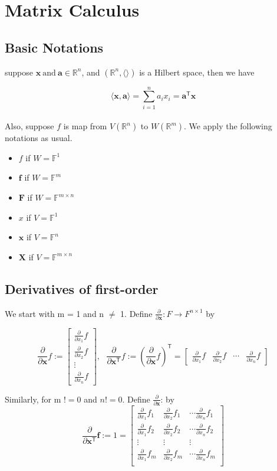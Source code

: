 \documentclass[12pt]{book}
\theoremstyle{definition}
\newcommand{\ra}{\rangle}
\newcommand{\la}{\langle}
\newcommand{\inner}[2]{{\langle #1,#2\rangle}}
\newcommand{\x}{\mathbf{x}}
\newcommand{\xt}{\mathbf{x}^{\mathsf{T}}}
\newcommand{\T}{{\mathsf{T}}}
\newcommand{\abf}{\mathbf{a}}
\newcommand{\abft}{\mathbf{a}^{\mathsf{T}}}
\newcommand{\R}{\mathbb{R}}
\newcommand{\F}{\mathbb{F}}
\newcommand{\X}{\mathbf{X}}
\newcommand{\f}{\mathbf{f}}
\newcommand{\pd}[1]{\frac{\partial}{\partial #1}}
\begin{document}
\chapter{Matrix Calculus}
\section{Basic Notations}
suppose $\x \ \text{and}\ \abf \in \mathbb{R}^n$, and $(\mathbb{R}^n,\la\ra)$ is a Hilbert space, then we have

$$\inner{\x}{\abf}=\sum_{i=1}^{n} a_ix_i=\abft\x$$ \\
Also, suppose $f$ is map from $V(\R^n)$ to $W(\R^m)$. We apply the following notations as usual.
\begin{itemize}
	\item $f$ if $W=\F^1$
	\item $\f$ if $W=\F^m$
	\item $\mathbf{F}$ if $W=\F^{m \times n}$
	\item $x$ if $V=\F^1$ 
	\item $\x$ if $V=\F^n$
	\item $\X$ if $V=\F^{m \times n}$
\end{itemize}


\section{Derivatives of first-order}

We start with m = 1 and n $\neq$ 1. Define $\frac{\partial}{\partial\x}: F \to F^{n 
\times 1}$ by


\begin{equation}
\pd{\x}f:=\begin{bmatrix}
\pd{x_1}f \\
\pd{x_2}f  \\
\vdots \\
\pd{x_n}f
\end{bmatrix}, \ \ \ 
\pd{\xt}f:=(\pd{\x}f)^\T=\begin{bmatrix}
\pd{x_1}f & \pd{x_2}f & \cdots &\pd{x_n}f
\end{bmatrix}
\end{equation}

Similarly, for m $!=0$ and $n!=0$. Define $\pd{\x}$: by 
\begin{equation}
\pd{\x^\T}\f :=1= \begin{bmatrix}
	\pd{x_1}f_1 & \pd{x_2}f_1 & \cdots \pd{x_n}f_1 \\
	\pd{x_1}f_2 & \pd{x_2}f_2 & \cdots \pd{x_n}f_2 \\
	\vdots & \vdots  &\vdots \\
	\pd{x_1}f_m & \pd{x_2}f_m & \cdots \pd{x_n}f_m \\
\end{bmatrix}
\end{equation}
\end{document}
